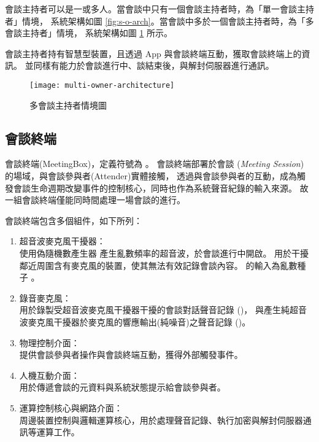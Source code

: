     會談主持者可以是一或多人。當會談中只有一個會談主持者時，為「單一會談主持者」情境，
系統架構如圖 \ref{fig:s-o-arch}。當會談中多於一個會談主持者時，為「多會談主持者」情境，
系統架構如圖 \ref{fig:m-o-arch} 所示。

    會談主持者持有智慧型裝置，且透過 App 與會談終端互動，獲取會談終端上的資訊。
並同樣有能力於會談進行中、談結束後，與解封伺服器進行通訊。

\begin{figure}[H]
    \centering
    \texttt{[image: multi-owner-architecture]}
    \caption{多會談主持者情境圖}\label{fig:m-o-arch}
\end{figure}


\subsection{會談終端}

    會談終端(MeetingBox)，定義符號為 \DEFmeetingbox 。
會談終端部署於會談 ({\it Meeting Session}) 的場域，與會談參與者(Attender)實體接觸，
透過與會談參與者的互動，成為觸發會談生命週期改變事件的控制核心，同時也作為系統聲音紀錄的輸入來源。
故一組會談終端僅能同時間處理一場會談的進行。

    會談終端包含多個組件，如下所列：

    \begin{enumerate}
        \item 超音波麥克風干擾器：\\
            使用偽隨機數產生器 \DEFfuncPRNG{} 產生亂數頻率的超音波，於會談進行中開啟。
            用於干擾鄰近周圍含有麥克風的裝置，使其無法有效記錄會談內容。
            \DEFfuncPRNG{} 的輸入為亂數種子 \DEFseed。

        \item 錄音麥克風：\\
            用於錄製受超音波麥克風干擾器干擾的會談對話聲音記錄 (\DEFrecJ)，
            與產生純超音波麥克風干擾器於麥克風的響應輸出(純噪音)之聲音記錄 (\DEFrecN)。

        \item 物理控制介面：\\
            提供會談參與者操作與會談終端互動，獲得外部觸發事件。

        \item 人機互動介面：\\
            用於傳遞會談的元資料與系統狀態提示給會談參與者。

        \item 運算控制核心與網路介面：\\
            周邊裝置控制與邏輯運算核心，用於處理聲音記錄、執行加密與解封伺服器通訊等運算工作。
    \end{enumerate}


